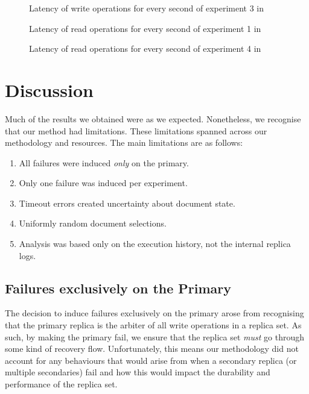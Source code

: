\begin{figure}
    
    \caption{Latency of write operations for every second of experiment 3 in }
    \label{fig:lat-pmm}
\end{figure}

\begin{figure}
    
    \caption{Latency of read operations for every second of experiment 1 in }
    \label{fig:rlat-plp}
\end{figure}

\begin{figure}
    
    \caption{Latency of read operations for every second of experiment 4 in }
    \label{fig:rlat-pplp}
\end{figure}

\section{Discussion}

Much of the results we obtained were as we expected. Nonetheless, we recognise that our method had limitations. These limitations spanned across our methodology and resources. 
The main limitations are as follows:
\begin{enumerate}
    \item All failures were induced \textit{only} on the primary.
    \item Only one failure was induced per experiment.
    \item Timeout errors created uncertainty about document state.
    \item Uniformly random document selections.
    \item Analysis was based only on the execution history, not the internal replica logs.
\end{enumerate}

\subsection{Failures exclusively on the Primary}
The decision to induce failures exclusively on the primary arose from recognising that the primary replica is the arbiter of all write operations in a replica set. As such, by making the primary fail, we ensure that the replica set \textit{must} go through some kind of recovery flow. Unfortunately, this means our methodology did not account for any behaviours that would arise from when a secondary replica (or multiple secondaries) fail and how this would impact the durability and performance of the replica set. 

